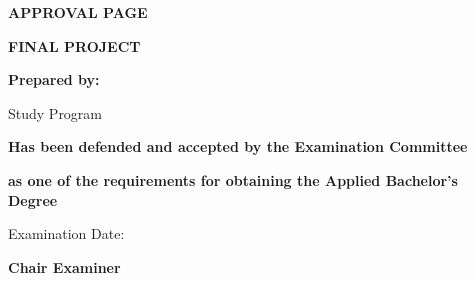 \newpage
{}

{%
    \fontsize{12}{14.4}\selectfont
    \setlength{\parskip}{0pt}%
    \setlength{\parindent}{0pt}%
    \renewcommand{\baselinestretch}{1}\selectfont%
    \begin{center}
    \begin{singlespace}
    \textbf{\selectfont APPROVAL PAGE}\par
    \textbf{\selectfont FINAL PROJECT}\par
    \vspace{\baselineskip}
    \textbf{\selectfont \titleen}\par
    \vspace{\baselineskip}
    \vspace{8pt}
    \textbf{\selectfont Prepared by:}\par
    \vspace{8pt}
    \authorname\par
    \studentid\par
    Study Program \studyprogram\par
    \vspace{2\baselineskip}
    \textbf{\selectfont Has been defended and accepted by the Examination Committee}\par
    \textbf{\selectfont as one of the requirements for obtaining the Applied Bachelor's Degree}\par
    Examination Date: \endorsementdate\par
    \vspace{\baselineskip}
    \textbf{\selectfont Chair Examiner}\par
    \vspace{2\baselineskip}

\end{singlespace}
\end{center}}
